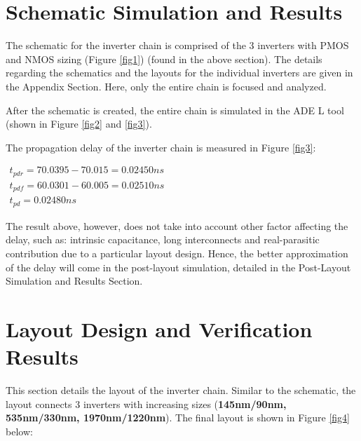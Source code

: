 \documentclass[letterpaper, 11pt]{article}
\begin{document}
\section{Schematic Simulation and Results}
\label{sec:schematic_design}

The schematic for the inverter chain is comprised of the 3 inverters with PMOS and NMOS sizing (Figure \ref{fig1}) (found in the above section). The details regarding the schematics and the layouts for the individual inverters are given in the Appendix Section. Here, only the entire chain is focused and analyzed.


After the schematic is created, the entire chain is simulated in the ADE L tool (shown in Figure \ref{fig2} and \ref{fig3}).



The propagation delay of the inverter chain is measured in Figure \ref{fig3}:

\begin{math}\label{eq6}
\begin{array}{l}
t_{pdr} = 70.0395 - 70.015 = 0.02450ns\\
t_{pdf} = 60.0301 - 60.005 = 0.02510ns\\
t_{pd} = 0.02480ns
\end{array}
\end{math}

The result above, however, does not take into account other factor affecting the delay, such as: intrinsic capacitance, long interconnects and real-parasitic contribution due to a particular layout design. Hence, the better approximation of the delay will come in the post-layout simulation, detailed in the Post-Layout Simulation and Results Section.

\section{Layout Design and Verification Results}
\label{sec:layout_desg_and_verification}

This section details the layout of the inverter chain. Similar to the schematic, the layout connects 3 inverters with increasing sizes (\textbf{145nm/90nm, 535nm/330nm, 1970nm/1220nm}). The final layout is shown in Figure \ref{fig4} below:

\end{document}
